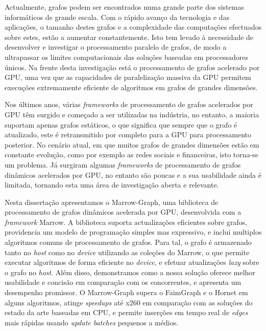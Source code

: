 
%

Actualmente, grafos podem ser encontrados numa grande parte dos sistemas informáticos de grande escala. Com o rápido avanço da tecnologia e das aplicações, o tamanho destes grafos e a complexidade das computações efectuados sobre estes, estão a aumentar constantemente. Isto tem levado à necessidade de desenvolver e investigar o processamento paralelo de grafos, de modo a ultrapassar os limites computacionais das soluções baseadas em processadores únicos. Na frente desta investigação está o processamento de grafos acelerado por \gls{GPU}, uma vez que as capacidades de paralelização massiva da \gls{GPU} permitem execuções extremamente eficiente de algoritmos em grafos de grandes dimensões. 

Nos últimos anos, várias \textit{frameworks} de processamento de grafos acelerados por \gls{GPU} têm surgido e começado a ser utilizadas na indústria, no entanto, a maioria suportam apenas grafos estáticos, o que significa que sempre que o grafo é atualizado, este é retransmitido por completo para a \gls{GPU} para processamento posterior. No cenário atual, em que muitos grafos de grandes dimensões estão em constante evolução, como por exemplo as redes sociais e financeiras, isto torna-se um problema. Já surgiram algumas \textit{frameworks} de processamento de grafos dinâmicos acelerados por \gls{GPU}, no entanto são poucas e a sua usabilidade ainda é limitada, tornando esta uma área de investigação aberta e relevante.

Nesta dissertação apresentamos o Marrow-Graph, uma biblioteca de processamento de grafos dinâmicos acelerada por \gls{GPU}, desenvolvida com a \textit{framework} Marrow. A biblioteca suporta actualizações eficientes sobre grafos, providencia um modelo de programação simples mas expressivo, e inclui multiplos algoritmos comuns de processamento de grafos. Para tal, o grafo é armazenado tanto no \textit{host} como no \textit{device} utilizando as coleções do Marrow, o que permite executar algoritmos de forma eficiente no \textit{device}, e efetuar atualizações \textit{lazy} sobre o grafo no \textit{host}. %
Além disso, demonstramos como a nossa solução oferece melhor usabilidade e concisão em comparação com os concorrentes, e apresenta um desempenho promissor. O Marrow-Graph supera o FaimGraph e o Hornet em alguns algoritmos, atinge \textit{speedups} até x260 em comparação com as soluções do estado da arte baseadas em \gls{CPU}, e permite inserções em tempo real de \textit{edges} mais rápidas usando \textit{update batches} pequenos a médios.


